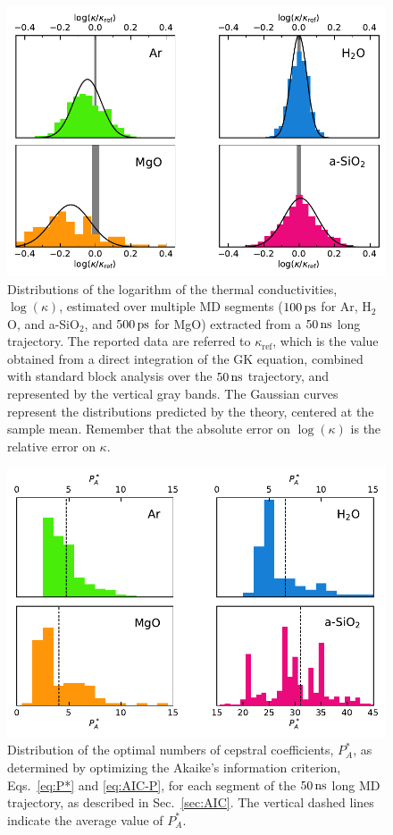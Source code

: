 \begin{figure}[!tb]
    \centering
    \includegraphics[width=\textwidth]{chapters/chapter5/figures/histograms.pdf}
    \caption{Distributions of the logarithm of the thermal conductivities, $\log(\kappa)$, estimated over multiple MD segments ($100\,\mathrm{ps}$ for Ar, H$_2$O, and a-SiO$_2$, and $500\,\mathrm{ps}$ for MgO) extracted from a $50\,\mathrm{ns}$ long trajectory. The reported data are referred to $\kappa_\mathrm{ref}$, which is the value obtained from a direct integration of the GK equation, combined with standard block analysis over the $50\,\mathrm{ns}$ trajectory, and represented by the vertical gray bands. The Gaussian curves represent the distributions predicted by the theory, centered at the sample mean. Remember that the absolute error on $\log(\kappa)$ is the relative error on $\kappa$.}
    \label{fig:histograms}
\end{figure}
\begin{figure}[!tb]
    \centering
    \includegraphics[width=\textwidth]{chapters/chapter5/figures/Pstar_distribution.pdf}
    \caption{Distribution of the optimal numbers of cepstral coefficients, $P_A^*$, as determined by optimizing the Akaike's information criterion, Eqs.~\eqref{eq:P*} and \eqref{eq:AIC-P}, for each segment of the $50\,\mathrm{ns}$ long MD trajectory, as described in Sec.~\ref{sec:AIC}. The vertical dashed lines indicate the average value of $P_A^*$.}
    \label{fig:Pstar_distribution}
\end{figure}


